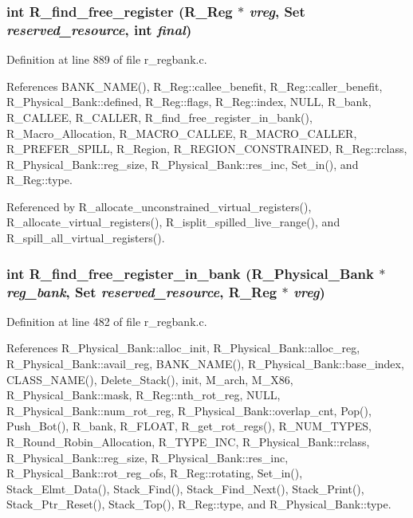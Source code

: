 \subsubsection{\setlength{\rightskip}{0pt plus 5cm}int R\_\-find\_\-free\_\-register (\bf{R\_\-Reg} $\ast$ {\em vreg}, \bf{Set} {\em reserved\_\-resource}, int {\em final})}\label{r__regproto_8h_280ac2e7a5d7fea0e22f8293451a51dc}




Definition at line 889 of file r\_\-regbank.c.

References BANK\_\-NAME(), R\_\-Reg::callee\_\-benefit, R\_\-Reg::caller\_\-benefit, R\_\-Physical\_\-Bank::defined, R\_\-Reg::flags, R\_\-Reg::index, NULL, R\_\-bank, R\_\-CALLEE, R\_\-CALLER, R\_\-find\_\-free\_\-register\_\-in\_\-bank(), R\_\-Macro\_\-Allocation, R\_\-MACRO\_\-CALLEE, R\_\-MACRO\_\-CALLER, R\_\-PREFER\_\-SPILL, R\_\-Region, R\_\-REGION\_\-CONSTRAINED, R\_\-Reg::rclass, R\_\-Physical\_\-Bank::reg\_\-size, R\_\-Physical\_\-Bank::res\_\-inc, Set\_\-in(), and R\_\-Reg::type.

Referenced by R\_\-allocate\_\-unconstrained\_\-virtual\_\-registers(), R\_\-allocate\_\-virtual\_\-registers(), R\_\-isplit\_\-spilled\_\-live\_\-range(), and R\_\-spill\_\-all\_\-virtual\_\-registers().
\subsubsection{\setlength{\rightskip}{0pt plus 5cm}int R\_\-find\_\-free\_\-register\_\-in\_\-bank (\bf{R\_\-Physical\_\-Bank} $\ast$ {\em reg\_\-bank}, \bf{Set} {\em reserved\_\-resource}, \bf{R\_\-Reg} $\ast$ {\em vreg})}\label{r__regproto_8h_62906af2907a84336bb2f9fcf3afd920}




Definition at line 482 of file r\_\-regbank.c.

References R\_\-Physical\_\-Bank::alloc\_\-init, R\_\-Physical\_\-Bank::alloc\_\-reg, R\_\-Physical\_\-Bank::avail\_\-reg, BANK\_\-NAME(), R\_\-Physical\_\-Bank::base\_\-index, CLASS\_\-NAME(), Delete\_\-Stack(), init, M\_\-arch, M\_\-X86, R\_\-Physical\_\-Bank::mask, R\_\-Reg::nth\_\-rot\_\-reg, NULL, R\_\-Physical\_\-Bank::num\_\-rot\_\-reg, R\_\-Physical\_\-Bank::overlap\_\-cnt, Pop(), Push\_\-Bot(), R\_\-bank, R\_\-FLOAT, R\_\-get\_\-rot\_\-regs(), R\_\-NUM\_\-TYPES, R\_\-Round\_\-Robin\_\-Allocation, R\_\-TYPE\_\-INC, R\_\-Physical\_\-Bank::rclass, R\_\-Physical\_\-Bank::reg\_\-size, R\_\-Physical\_\-Bank::res\_\-inc, R\_\-Physical\_\-Bank::rot\_\-reg\_\-ofs, R\_\-Reg::rotating, Set\_\-in(), Stack\_\-Elmt\_\-Data(), Stack\_\-Find(), Stack\_\-Find\_\-Next(), Stack\_\-Print(), Stack\_\-Ptr\_\-Reset(), Stack\_\-Top(), R\_\-Reg::type, and R\_\-Physical\_\-Bank::type.

